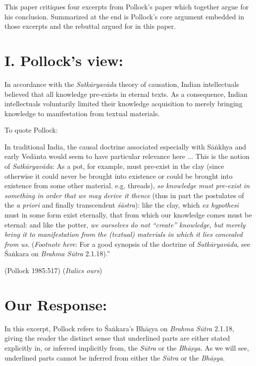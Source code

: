 This paper critiques four excerpts from Pollock's paper which together argue for his conclusion. Summarized at the end is Pollock's core argument embedded in those excerpts and the rebuttal argued for in this paper.

\section*{I. Pollock's view:}  

In accordance with the {\sl Satkāryavāda} theory of causation, Indian intellectuals believed that all knowledge pre-exists in eternal texts. As a consequence, Indian intellectuals voluntarily limited their knowledge acquisition to merely bringing knowledge to manifestation from textual materials.

To quote Pollock:
\begin{myquote}
In traditional India, the causal doctrine associated especially with Sāṅkhya and early Vedānta would seem to have particular relevance here ... This is the notion of {\sl Satkāryavāda}: As a pot, for example, must pre-exist in the clay (since otherwise it could never be brought into existence or could be brought into existence from some other material. e.g.  threads), {\sl so knowledge must pre-exist in something in order that we may derive it thence} (thus in part the postulates of the {\sl a priori} and finally transcendent {\sl śāstra}): like the clay, which {\sl ex hypothesi} must in some form exist eternally, that from which our knowledge comes must be eternal: and like the potter, {\sl we ourselves do not ``create'' knowledge, but merely bring it to manifestation from the (textual) materials in which it lies concealed from us}. ({\sl Footnote here}: For a good synopsis of the doctrine of {\sl Satkāryavāda}, see Śaṅkara on {\sl Brahma Sūtra} 2.1.18).''  

\hfill (Pollock 1985:517) ({\sl Italics ours})
\end{myquote}

\section*{Our Response:}

In this excerpt, Pollock refers to Śaṅkara's Bhāṣya on {\sl Brahma Sūtra} 2.1.18, giving the reader the distinct sense that underlined parts are either stated explicitly in, or inferred implicitly from, the {\sl Sūtra} or the {\sl Bhāṣya}.  As we will see, underlined parts cannot be inferred from either the {\sl Sūtra} or the {\sl Bhāṣya}.

